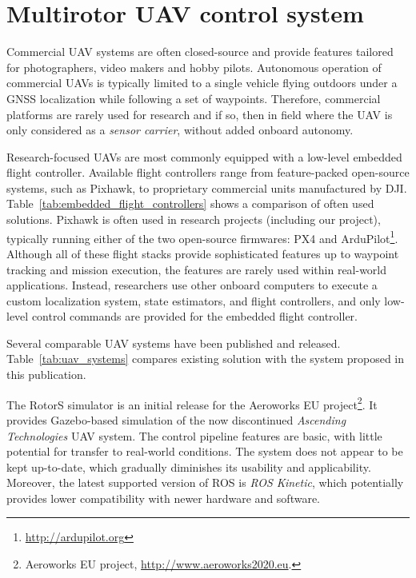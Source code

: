 \documentclass[a4paper,11pt,titlepage,twoside]{book}
\begin{document}

\section{Multirotor UAV control system}

Commercial \ac{UAV} systems are often closed-source and provide features tailored for photographers, video makers and hobby pilots.
Autonomous operation of commercial \acp{UAV} is typically limited to a single vehicle flying outdoors under a \ac{GNSS} localization while following a set of waypoints.
Therefore, commercial platforms are rarely used for research and if so, then in field where the \ac{UAV} is only considered as a \emph{sensor carrier}, without added onboard autonomy.

Research-focused \acp{UAV} are most commonly equipped with a low-level embedded flight controller.
Available flight controllers \cite{ebeid2018survey} range from feature-packed open-source systems, such as Pixhawk, to proprietary commercial units manufactured by DJI.
Table~\ref{tab:embedded_flight_controllers} shows a comparison of often used solutions.
Pixhawk is often used in research projects (including our project), typically running either of the two open-source firmwares: PX4 \cite{meier2015px4} and ArduPilot\footnote{\url{http://ardupilot.org}}.
Although all of these flight stacks provide sophisticated features up to waypoint tracking and mission execution, the features are rarely used within real-world applications.
Instead, researchers use other onboard computers to execute a custom localization system, state estimators, and flight controllers, and only low-level control commands are provided for the embedded flight controller.

Several comparable \ac{UAV} systems have been published and released.
Table~\ref{tab:uav_systems} compares existing solution with the system proposed in this publication.

The RotorS \cite{furrer2016rotors} simulator is an initial release for the Aeroworks EU project\footnote{Aeroworks EU project, \url{http://www.aeroworks2020.eu}.}.
It provides Gazebo-based simulation of the now discontinued \emph{Ascending Technologies} \ac{UAV} system.
The control pipeline features are basic, with little potential for transfer to real-world conditions.
The system does not appear to be kept up-to-date, which gradually diminishes its usability and applicability.
Moreover, the latest supported version of ROS is \emph{ROS Kinetic}, which potentially provides lower compatibility with newer hardware and software.
\end{document}

